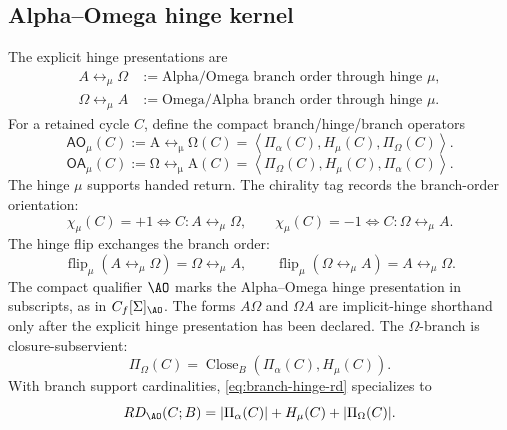 \subsection{Alpha--Omega hinge kernel}\label{subsec:ao-kernel}
\begin{definition}
The explicit hinge presentations are
\begin{align*}
A\leftrightarrow_{\mu}\Omega
&:=
\text{Alpha/Omega branch order through hinge }\mu,\\
\Omega\leftrightarrow_{\mu}A
&:=
\text{Omega/Alpha branch order through hinge }\mu.
\end{align*}
For a retained cycle \(C\), define the compact branch/hinge/branch operators
\begin{equation}
\mathsf{AO}_{\mu}(C)
:=
\operatorname{A\leftrightarrow_{\mu}\Omega}(C)
=
\left\langle
\Pi_\alpha(C),
H_\mu(C),
\Pi_\Omega(C)
\right\rangle.
\label{eq:ao-kernel}
\end{equation}
\begin{equation}
\mathsf{OA}_{\mu}(C)
:=
\operatorname{\Omega\leftrightarrow_{\mu}A}(C)
=
\left\langle
\Pi_\Omega(C),
H_\mu(C),
\Pi_\alpha(C)
\right\rangle.
\label{eq:omega-alpha-hinge-kernel}
\end{equation}
The hinge \(\mu\) supports handed return. The chirality tag records the branch-order orientation:
\begin{equation}
\chi_\mu(C)=+1
\Longleftrightarrow
C:A\leftrightarrow_{\mu}\Omega,
\qquad
\chi_\mu(C)=-1
\Longleftrightarrow
C:\Omega\leftrightarrow_{\mu}A.
\label{eq:hinge-chirality-tag}
\end{equation}
The hinge flip exchanges the branch order:
\begin{equation}
\operatorname{flip}_\mu(A\leftrightarrow_{\mu}\Omega)=\Omega\leftrightarrow_{\mu}A,
\qquad
\operatorname{flip}_\mu(\Omega\leftrightarrow_{\mu}A)=A\leftrightarrow_{\mu}\Omega.
\label{eq:hinge-chirality-flip}
\end{equation}
The compact qualifier \(\AO\) marks the Alpha--Omega hinge presentation in subscripts, as in \(C_f[\Sigma]_{\AO}\). The forms \(A\Omega\) and \(\Omega A\) are implicit-hinge shorthand only after the explicit hinge presentation has been declared.
The \(\Omega\)-branch is closure-subservient:
\begin{equation}
\Pi_\Omega(C)=\operatorname{Close}_B(\Pi_\alpha(C),H_\mu(C)).
\label{eq:omega-close}
\end{equation}
With branch support cardinalities, \eqref{eq:branch-hinge-rd} specializes to
\begin{equation}
RD_{\AO}(C;B)
=
|\Pi_\alpha(C)|+H_\mu(C)+|\Pi_\Omega(C)|.
\label{eq:ao-rd-accessor-kernel}
\end{equation}
\end{definition}

